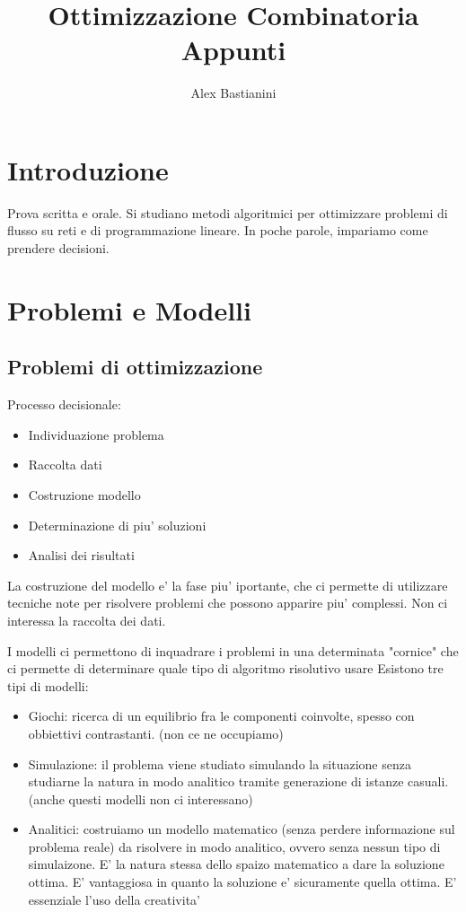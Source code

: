 \documentclass{report}
\title{\Huge{Ottimizzazione Combinatoria}\\Appunti}
\author{\huge{Alex Bastianini}}
\date{}
\begin{document}
\maketitle
\newpage%
\tableofcontents

\pagebreak

\chapter{Introduzione}
Prova scritta e orale. Si studiano metodi algoritmici per ottimizzare problemi di flusso su reti e di programmazione lineare. In poche parole, impariamo come prendere decisioni.

\chapter{Problemi e Modelli}
\section{Problemi di ottimizzazione}

Processo decisionale:
\begin{itemize}
\item Individuazione problema
  \item Raccolta dati
    \item Costruzione modello
      \item Determinazione di piu' soluzioni
        \item Analisi dei risultati
\end{itemize}

La costruzione del modello e' la fase piu' iportante, che ci permette di utilizzare tecniche note per risolvere problemi che possono apparire piu' complessi. Non ci interessa la raccolta dei dati. 

I modelli ci permettono di inquadrare i problemi in una determinata "cornice" che ci permette di determinare quale tipo di algoritmo risolutivo usare Esistono tre tipi di modelli:
\begin{itemize}
\item Giochi: ricerca di un equilibrio fra le componenti coinvolte, spesso con obbiettivi contrastanti. (non ce ne occupiamo)
\item Simulazione: il problema viene studiato simulando la situazione senza studiarne la natura in modo analitico tramite generazione di istanze casuali. (anche questi modelli non ci interessano)
\item Analitici: costruiamo un modello matematico (senza perdere informazione sul problema reale) da risolvere in modo analitico, ovvero senza nessun tipo di simulaizone. E' la natura stessa dello spaizo matematico a dare la soluzione ottima. E' vantaggiosa in quanto la soluzione e' sicuramente quella ottima. E' essenziale l'uso della creativita'
\end{itemize}
\end{document}
